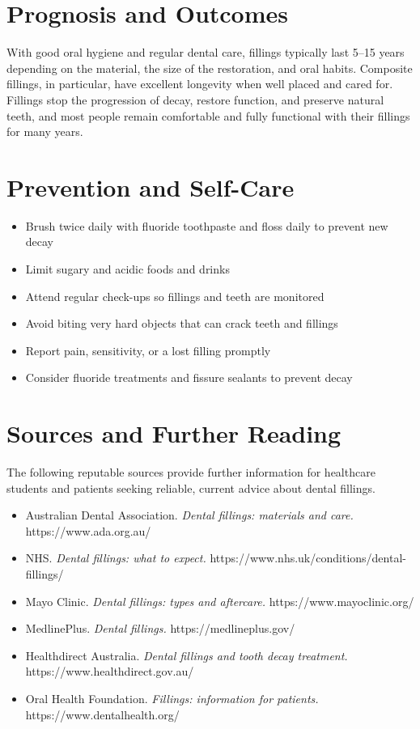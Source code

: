 \section*{Prognosis and Outcomes}
With good oral hygiene and regular dental care, fillings typically last 5--15 years depending on the material, the size of the restoration, and oral habits. Composite fillings, in particular, have excellent longevity when well placed and cared for. Fillings stop the progression of decay, restore function, and preserve natural teeth, and most people remain comfortable and fully functional with their fillings for many years.

\section*{Prevention and Self-Care}
\begin{itemize}
    \item Brush twice daily with fluoride toothpaste and floss daily to prevent new decay
    \item Limit sugary and acidic foods and drinks
    \item Attend regular check-ups so fillings and teeth are monitored
    \item Avoid biting very hard objects that can crack teeth and fillings
    \item Report pain, sensitivity, or a lost filling promptly
    \item Consider fluoride treatments and fissure sealants to prevent decay
\end{itemize}

\section*{Sources and Further Reading}
The following reputable sources provide further information for healthcare students and patients seeking reliable, current advice about dental fillings.

\begin{itemize}
    \item Australian Dental Association. \textit{Dental fillings: materials and care.} https://www.ada.org.au/
    \item NHS. \textit{Dental fillings: what to expect.} https://www.nhs.uk/conditions/dental-fillings/
    \item Mayo Clinic. \textit{Dental fillings: types and aftercare.} https://www.mayoclinic.org/
    \item MedlinePlus. \textit{Dental fillings.} https://medlineplus.gov/
    \item Healthdirect Australia. \textit{Dental fillings and tooth decay treatment.} https://www.healthdirect.gov.au/
    \item Oral Health Foundation. \textit{Fillings: information for patients.} https://www.dentalhealth.org/
\end{itemize}
